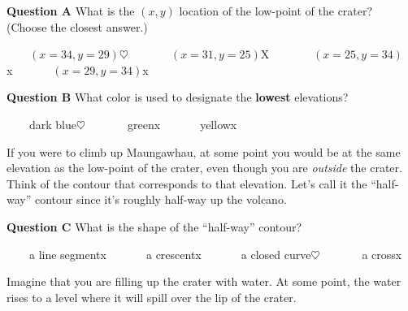 \documentclass[
  letterpaper,
  DIV=11,
  numbers=noendperiod,
  oneside]{article}
\begin{document}
\begin{multicols}{2}
\begin{table}
\begin{minipage}[t]{\linewidth}
{\centering 

\textbf{Question A} What is the \((x, y)\) location of the low-point of
the crater? (Choose the closest answer.)

~~~~{\((x=34, y=29)\){\(\heartsuit\ \)}}~~~~~~~{\((x=31, y=25)\){︎X
}}~~~~~~~{\((x=25, y=34)\){x}}~~~~~~~{\((x=29, y=34)\){x}}

}

\end{minipage}%
\newline
\begin{minipage}[t]{\linewidth}

{\centering 

\textbf{Question B} What color is used to designate the \textbf{lowest}
elevations?

~~~~{dark blue{\(\heartsuit\ \)}}~~~~~~~{green{x}}~~~~~~~{yellow{x}}

}

\end{minipage}%
\newline
\begin{minipage}[t]{\linewidth}

{\centering 

If you were to climb up Maungawhau, at some point you would be at the
same elevation as the low-point of the crater, even though you are
\emph{outside} the crater. Think of the contour that corresponds to that
elevation. Let's call it the ``half-way'' contour since it's roughly
half-way up the volcano.

}

\end{minipage}%
\newline
\begin{minipage}[t]{\linewidth}

{\centering 

\textbf{Question C} What is the shape of the ``half-way'' contour?

~~~~{a line segment{x}}~~~~~~~{a crescent{x}}~~~~~~~{a closed
curve{\(\heartsuit\ \)}}~~~~~~~{a cross{x}}

}

\end{minipage}%
\newline
\begin{minipage}[t]{\linewidth}

{\centering 

Imagine that you are filling up the crater with water. At some point,
the water rises to a level where it will spill over the lip of the
crater.

}
\end{minipage}
\end{table}
\end{multicols}
\end{document}
